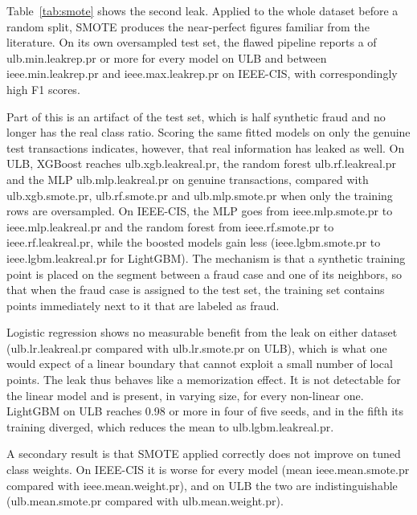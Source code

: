 

Table~\ref{tab:smote} shows the second leak. Applied to the whole dataset before a random split, SMOTE produces the near-perfect figures familiar from the literature. On its own oversampled test set, the flawed pipeline reports a \prauc{} of \num{ulb.min.leakrep.pr} or more for every model on ULB and between \num{ieee.min.leakrep.pr} and \num{ieee.max.leakrep.pr} on IEEE-CIS, with correspondingly high F1 scores.

Part of this is an artifact of the test set, which is half synthetic fraud and no longer has the real class ratio. Scoring the same fitted models on only the genuine test transactions indicates, however, that real information has leaked as well. On ULB, XGBoost reaches \num{ulb.xgb.leakreal.pr}, the random forest \num{ulb.rf.leakreal.pr} and the MLP \num{ulb.mlp.leakreal.pr} on genuine transactions, compared with \num{ulb.xgb.smote.pr}, \num{ulb.rf.smote.pr} and \num{ulb.mlp.smote.pr} when only the training rows are oversampled. On IEEE-CIS, the MLP goes from \num{ieee.mlp.smote.pr} to \num{ieee.mlp.leakreal.pr} and the random forest from \num{ieee.rf.smote.pr} to \num{ieee.rf.leakreal.pr}, while the boosted models gain less (\num{ieee.lgbm.smote.pr} to \num{ieee.lgbm.leakreal.pr} for LightGBM). The mechanism is that a synthetic training point is placed on the segment between a fraud case and one of its neighbors, so that when the fraud case is assigned to the test set, the training set contains points immediately next to it that are labeled as fraud.

Logistic regression shows no measurable benefit from the leak on either dataset (\num{ulb.lr.leakreal.pr} compared with \num{ulb.lr.smote.pr} on ULB), which is what one would expect of a linear boundary that cannot exploit a small number of local points. The leak thus behaves like a memorization effect. It is not detectable for the linear model and is present, in varying size, for every non-linear one. LightGBM on ULB reaches 0.98 or more in four of five seeds, and in the fifth its training diverged, which reduces the mean to \num{ulb.lgbm.leakreal.pr}.

A secondary result is that SMOTE applied correctly does not improve on tuned class weights. On IEEE-CIS it is worse for every model (mean \prauc{} \num{ieee.mean.smote.pr} compared with \num{ieee.mean.weight.pr}), and on ULB the two are indistinguishable (\num{ulb.mean.smote.pr} compared with \num{ulb.mean.weight.pr}).

